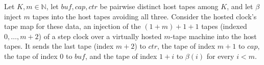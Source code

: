 \begin{theorem}
\label{Turing.NTimeDiag.dzClkEmb_eqs}
\leanok
{}
Let $K, m \in \mathbb{N}$, let $\mathit{buf}, \mathit{cap}, \mathit{ctr}$ be pairwise distinct host
tapes among $K$, and let $\beta$ inject $m$ tapes into the host tapes avoiding all three. Consider
the hosted clock's tape map for these data, an injection of the $(1 + m) + 1 + 1$ tapes (indexed
$0, \dots, m + 2$) of a step clock over a virtually hosted $m$-tape machine into the host tapes. It
sends the last tape (index $m + 2$) to $\mathit{ctr}$, the tape of index $m + 1$ to $\mathit{cap}$,
the tape of index $0$ to $\mathit{buf}$, and the tape of index $1 + i$ to $\beta(i)$ for every $i <
m$.
\end{theorem}

